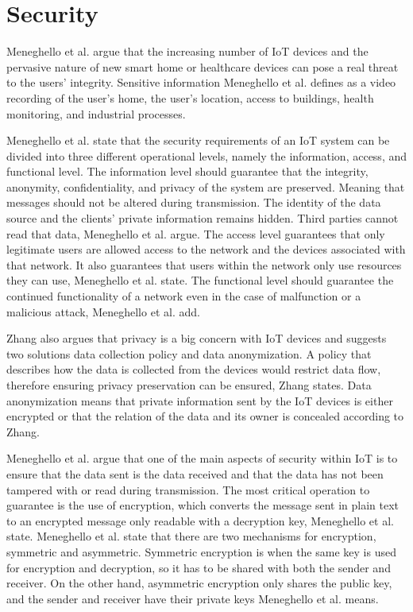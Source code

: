 \section{Security}
Meneghello et al. argue that the increasing number of IoT devices and the pervasive nature of new smart home or healthcare devices can pose a real threat to the users' integrity.
Sensitive information Meneghello et al. defines as a video recording of the user's home, the user's location, access to buildings, health monitoring, and industrial processes.\cite{Meneghello2019}

Meneghello et al. state that the security requirements of an IoT system can be divided into three different operational levels, namely the information, access, and functional level.
The information level should guarantee that the integrity, anonymity, confidentiality, and privacy of the system are preserved. 
Meaning that messages should not be altered during transmission. The identity of the data source and the clients' private information remains hidden. Third parties cannot read that data, Meneghello et al. argue.
The access level guarantees that only legitimate users are allowed access to the network and the devices associated with that network. 
It also guarantees that users within the network only use resources they can use, Meneghello et al. state.
The functional level should guarantee the continued functionality of a network even in the case of malfunction or a malicious attack, Meneghello et al. add.\cite{Meneghello2019}

Zhang also argues that privacy is a big concern with IoT devices and suggests two solutions data collection policy and data anonymization.
A policy that describes how the data is collected from the devices would restrict data flow, therefore ensuring privacy preservation can be ensured, Zhang states.
Data anonymization means that private information sent by the IoT devices is either encrypted or that the relation of the data and its owner is concealed according to Zhang.\cite{Zhang2014}

Meneghello et al. argue that one of the main aspects of security within IoT is to ensure that the data sent is the data received and that the data has not been tampered with or read during transmission.
The most critical operation to guarantee is the use of encryption, which converts the message sent in plain text to an encrypted message only readable with a decryption key, Meneghello et al. state.
Meneghello et al. state that there are two mechanisms for encryption, symmetric and asymmetric.
Symmetric encryption is when the same key is used for encryption and decryption, so it has to be shared with both the sender and receiver.
On the other hand, asymmetric encryption only shares the public key, and the sender and receiver have their private keys Meneghello et al. means.\cite{Meneghello2019}

